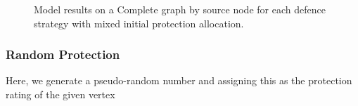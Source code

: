 \documentclass[results.tex]{subfiles}
\begin{document}
\begin{figure}[!ht]
\begin{subfigure}[b]{0.9\textwidth}
         \label{fig:com-mix-end}
     \end{subfigure}
        \caption{Model results on a Complete graph by source node for each defence strategy with mixed initial protection allocation.}
        \label{fig:com-mix-charts}
\end{figure}

\newpage

\subsubsection{Random Protection}

Here, we generate a pseudo-random number and assigning this as the protection rating of the given vertex


\end{document}
